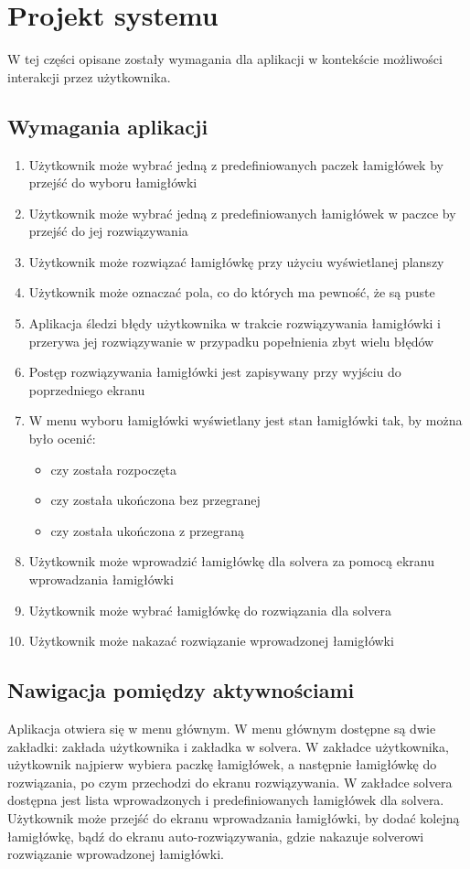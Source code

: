 \chapter{Projekt systemu}
\thispagestyle{chapterBeginStyle}

    W tej części opisane zostały wymagania dla aplikacji w kontekście możliwości interakcji przez
użytkownika.



\section{Wymagania aplikacji}
\begin{enumerate}
    \item Użytkownik może wybrać jedną z predefiniowanych paczek łamigłówek by przejść do wyboru łamigłówki
    \item Użytkownik może wybrać jedną z predefiniowanych łamigłówek w paczce by przejść do jej rozwiązywania
    \item Użytkownik może rozwiązać łamigłówkę przy użyciu wyświetlanej planszy
    \item Użytkownik może oznaczać pola, co do których ma pewność, że są puste
    \item Aplikacja śledzi błędy użytkownika w trakcie rozwiązywania łamigłówki i przerywa jej rozwiązywanie
w przypadku popełnienia zbyt wielu błędów
    \item Postęp rozwiązywania łamigłówki jest zapisywany przy wyjściu do poprzedniego ekranu
    \item W menu wyboru łamigłówki wyświetlany jest stan łamigłówki tak, by można było ocenić:
    \begin{itemize}
        \item czy została rozpoczęta
        \item czy została ukończona bez przegranej
        \item czy została ukończona z przegraną
    \end{itemize}
    \item Użytkownik może wprowadzić łamigłówkę dla solvera za pomocą ekranu wprowadzania łamigłówki
    \item Użytkownik może wybrać łamigłówkę do rozwiązania dla solvera
    \item Użytkownik może nakazać rozwiązanie wprowadzonej łamigłówki
\end{enumerate}



\section{Nawigacja pomiędzy aktywnościami}
    Aplikacja otwiera się w menu głównym. W menu głównym dostępne są dwie zakładki: zakłada użytkownika
i zakładka w solvera. W zakładce użytkownika, użytkownik najpierw wybiera paczkę łamigłówek, a
następnie łamigłówkę do rozwiązania, po czym przechodzi do ekranu rozwiązywania. W zakładce solvera
dostępna jest lista wprowadzonych i predefiniowanych łamigłówek dla solvera. Użytkownik może przejść
do ekranu wprowadzania łamigłówki, by dodać kolejną łamigłówkę, bądź do ekranu auto-rozwiązywania,
gdzie nakazuje solverowi rozwiązanie wprowadzonej łamigłówki.

